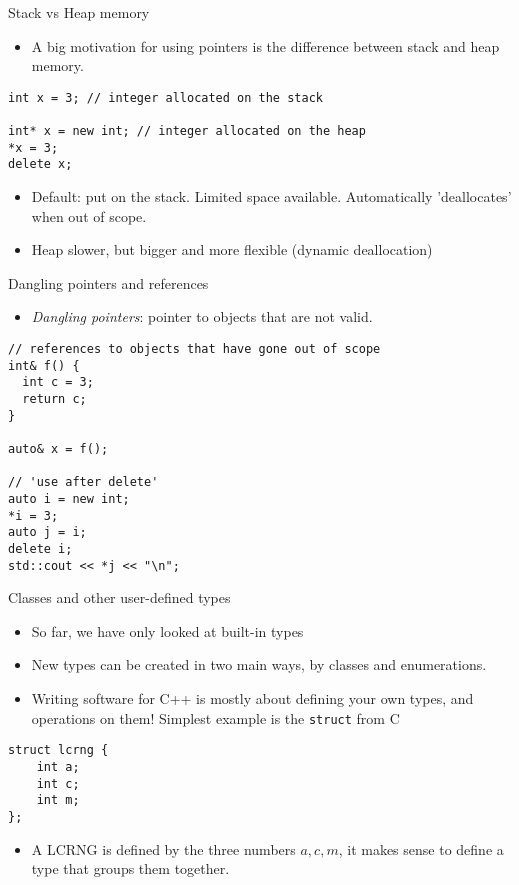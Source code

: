 \documentclass[10pt]{beamer}
\begin{document}
\begin{frame}[fragile,label={sec:org20f956a}]{Stack vs Heap memory}
 \begin{itemize}
\item A big motivation for using pointers is the difference between stack and heap
memory.
\end{itemize}

\begin{verbatim}
int x = 3; // integer allocated on the stack

int* x = new int; // integer allocated on the heap
*x = 3;
delete x;
\end{verbatim}

\begin{itemize}
\item Default: put on the stack. Limited space available. Automatically 'deallocates' when out of scope.
\item Heap slower, but bigger and more flexible (dynamic deallocation)
\end{itemize}
\end{frame}

\begin{frame}[fragile,label={sec:org9e8feb1}]{Dangling pointers and references}
 \begin{itemize}
\item \emph{Dangling pointers}: pointer to objects that are not valid.
\end{itemize}
\begin{verbatim}
// references to objects that have gone out of scope
int& f() {
  int c = 3;
  return c;
}

auto& x = f();

// 'use after delete'
auto i = new int;
*i = 3;
auto j = i;
delete i;
std::cout << *j << "\n";
\end{verbatim}
\end{frame}
\begin{frame}[fragile,label={sec:orgcdcfc5d}]{Classes and other user-defined types}
 \begin{itemize}
\item So far, we have only looked at \alert{built-in types}
\item New types can be created in two main ways, by \alert{classes} and \alert{enumerations}.
\item Writing software for C++ is mostly about defining your own types, and
operations on them! Simplest example is the \texttt{struct} from C
\end{itemize}

\begin{verbatim}
struct lcrng {
    int a;
    int c;
    int m;
};
\end{verbatim}

\begin{itemize}
\item A LCRNG is defined by the three numbers \(a, c, m\), it makes sense to define a
type that groups them together.
\end{itemize}
\end{frame}
\end{document}
